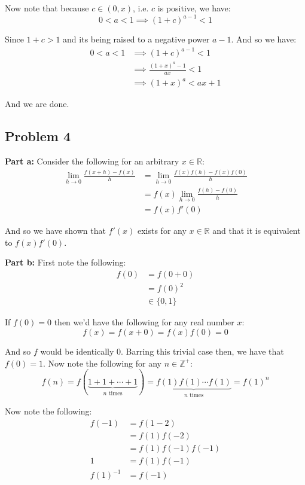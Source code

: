 \documentclass{article}
\newcommand{\R}{\mathbb R}
\newcommand{\Z}{\mathbb Z}
\begin{document}
Now note that because $c\in(0,x)$, i.e. $c$ is positive, we have:
$$0<a<1\implies (1+c)^{a-1}<1$$

Since $1+c>1$ and its being raised to a negative power $a-1$. And so we have:
\begin{align*}
  0<a<1&\implies (1+c)^{a-1}<1\tag{see above}\\
  &\implies \frac{(1+x)^a-1}{ax}<1\tag{see above}\\
  &\implies (1+x)^a<ax+1
\end{align*}

And we are done.

\subsection*{Problem 4}
\noindent\textbf{Part a:} Consider the following for an arbitrary $x\in\R$:
\begin{align*}
  \lim_{h\to0}\frac{f(x+h)-f(x)}{h}&=\lim_{h\to0}\frac{f(x)f(h)-f(x)f(0)}{h}\tag{def. of $f$}\\
  &=f(x)\lim_{h\to0}\frac{f(h)-f(0)}{h}\tag{linearity of limit}\\
  &=f(x)f'(0)\tag{def. of $f'(0)$ \& assume $f'(0)$ exists}
\end{align*}

And so we have shown that $f'(x)$ exists for any $x\in\R$ and that it is equivalent to $f(x)f'(0)$.
\bigskip

\noindent\textbf{Part b:} First note the following:
\begin{align*}
  f(0)&=f(0+0)\\
  &=f(0)^2\tag{def. of $f$}\\
  &\in\{0,1\}
\end{align*}

If $f(0)=0$ then we'd have the following for any real number $x$:
$$f(x)=f(x+0)=f(x)f(0)=0$$

And so $f$ would be identically 0. Barring this trivial case then, we have that $f(0)=1$. Now note the following for any $n\in\Z^+$:
$$f(n)=f(\underbrace{1+1+\cdots+1}_{n\text{ times}})=\underbrace{f(1)f(1)\cdots f(1)}_{n\text{ times}}=f(1)^n$$

Now note the following:
\begin{align*}
  f(-1)&=f(1-2)\\
  &=f(1)f(-2)\\
  &=f(1)f(-1)f(-1)\\
  1&=f(1)f(-1)\\
  f(1)^{-1}&=f(-1)
\end{align*}
\end{document}
